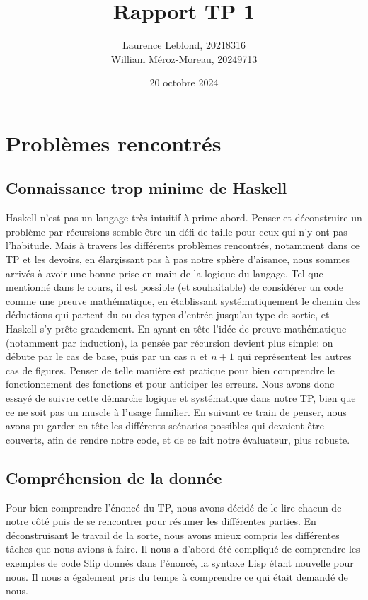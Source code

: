 \documentclass{article}
\title{Rapport TP 1}
\author{Laurence Leblond, 20218316 \\ William Méroz-Moreau, 20249713}
\date{20 octobre 2024}
\begin{document}
	\maketitle

	\section{Problèmes rencontrés}

	\subsection{Connaissance trop minime de Haskell}

	Haskell n'est pas un langage très intuitif à prime abord. Penser et déconstruire
	un problème par récursions semble être un défi de taille pour ceux qui n'y ont
	pas l'habitude. Mais à travers les différents problèmes rencontrés, notamment dans
	ce TP et les devoirs, en élargissant pas à pas notre sphère d'aisance, nous sommes
	arrivés à avoir une bonne prise en main de la logique du langage. Tel que
	mentionné dans le cours, il est possible (et souhaitable) de considérer un code
	comme une preuve mathématique, en établissant systématiquement le chemin des
	déductions qui partent du ou des types d'entrée jusqu'au type de sortie, et Haskell
	s'y prête grandement. En ayant en tête l'idée de preuve mathématique (notamment
	par induction), la pensée par récursion devient plus simple: on débute par le
	cas de base, puis par un cas $n$ et $n+1$ qui représentent les autres cas de figures.
	Penser de telle manière est pratique pour bien comprendre le fonctionnement
	des fonctions et pour anticiper les erreurs. Nous avons donc essayé de suivre cette
	démarche logique et systématique dans notre TP, bien que ce ne soit pas un
	muscle à l'usage familier. En suivant ce train de penser, nous avons pu garder
	en tête les différents scénarios possibles qui devaient être couverts, afin de rendre
	notre code, et de ce fait notre évaluateur, plus robuste.

	\subsection{Compréhension de la donnée}

	Pour bien comprendre l'énoncé du TP, nous avons décidé de le lire chacun de notre
	côté puis de se rencontrer pour résumer les différentes parties. En
	déconstruisant le travail de la sorte, nous avons mieux compris les différentes
	tâches que nous avions à faire. Il nous a d'abord été compliqué de comprendre
	les exemples de code Slip donnés dans l'énoncé, la syntaxe Lisp étant nouvelle
	pour nous. Il nous a également pris du temps à comprendre ce qui était demandé
	de nous.
\end{document}
